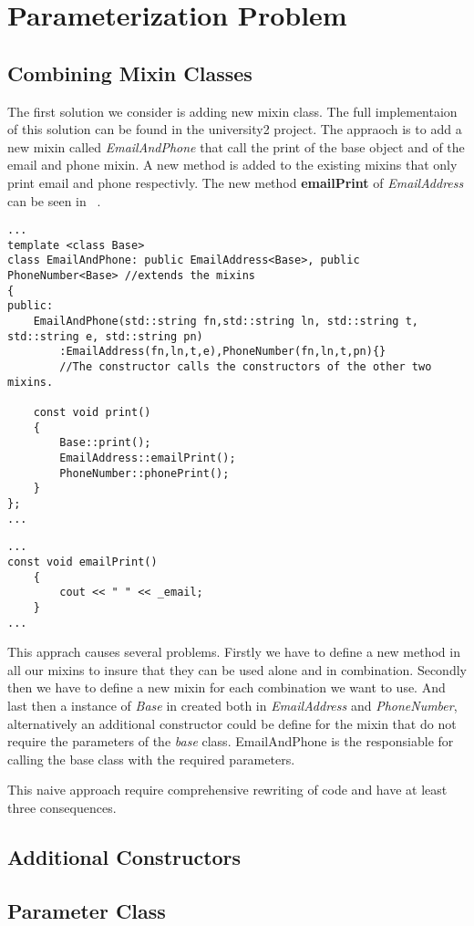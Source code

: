 \section{Parameterization Problem}

\subsection{Combining Mixin Classes}
The first solution we consider is adding new mixin class.
The full implementaion of this solution can be found in the university2 project.
The appraoch is to add a new mixin called \textit{EmailAndPhone} that call the print of the base object and of the email and phone mixin.
A new method is added to the existing mixins that only print email and phone respectivly.
The new method \textbf{emailPrint} of \textit{EmailAddress} can be seen in ~.

\begin{lstlisting}[style=cpp, caption=\myCaption{}, label=emailandphone]
...
template <class Base>
class EmailAndPhone: public EmailAddress<Base>, public PhoneNumber<Base> //extends the mixins
{
public:
    EmailAndPhone(std::string fn,std::string ln, std::string t, std::string e, std::string pn)
        :EmailAddress(fn,ln,t,e),PhoneNumber(fn,ln,t,pn){}
        //The constructor calls the constructors of the other two mixins.
    
    const void print() 
    {
        Base::print();
        EmailAddress::emailPrint();
        PhoneNumber::phonePrint();
    }
};
...
\end{lstlisting}


\begin{lstlisting}[style=cpp, caption=\myCaption{}, label=EmailAddress2]
...
const void emailPrint() 
    {     
        cout << " " << _email;
    }
...
\end{lstlisting}

This apprach causes several problems. 
Firstly we have to define a new method in all our mixins to insure that they can be used alone and in combination. Secondly then we have to define a new mixin for each combination we want to use. And last then a instance of \textit{Base} in created both in \textit{EmailAddress} and \textit{PhoneNumber}, alternatively an additional constructor could be define for the mixin that do not require the parameters of the \textit{base} class. 
EmailAndPhone is the responsiable for calling the base class with the required parameters.

This naive approach require comprehensive rewriting of code and have at least three consequences. 

\subsection{Additional Constructors}


\subsection{Parameter Class}

